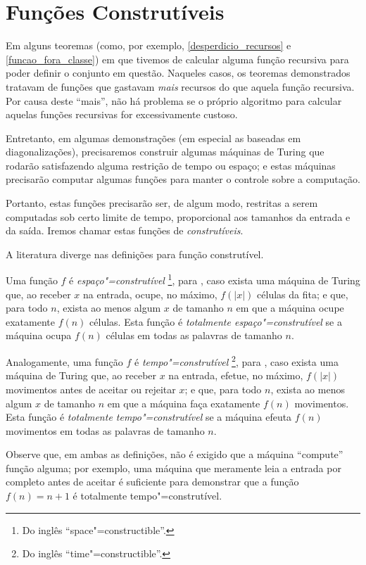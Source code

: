 \section{Funções Construtíveis}

Em alguns teoremas
(como, por exemplo, \ref{desperdicio_recursos} e \ref{funcao_fora_classe})
em que tivemos de calcular alguma função recursiva
para poder definir o conjunto em questão.
Naqueles casos,
os teoremas demonstrados tratavam de funções
que gastavam \emph{mais} recursos do que aquela função recursiva.
Por causa deste ``mais'',
não há problema
se o próprio algoritmo para calcular aquelas funções recursivas
for excessivamente custoso.

Entretanto,
em algumas demonstrações
(em especial as baseadas em diagonalizações),
precisaremos construir algumas máquinas de Turing
que rodarão satisfazendo alguma restrição de tempo ou espaço;
e estas máquinas precisarão computar algumas funções
para manter o controle sobre a computação.

Portanto,
estas funções precisarão ser,
de algum modo,
restritas a serem computadas sob certo limite de tempo,
proporcional aos tamanhos da entrada e da saída.
Iremos chamar estas funções de \emph{construtíveis}.

A literatura diverge nas definições para função construtível.

Uma função $f$ é \emph{espaço"=construtível}
\footnote{
    Do inglês ``space"=constructible''.
}, para
,
caso exista uma máquina de Turing que,
ao receber $x$ na entrada,
ocupe, no máximo, $f(|x|)$ células da fita;
e que, para todo $n$, exista ao menos algum $x$ de tamanho $n$
em que a máquina ocupe exatamente $f(n)$ células.
Esta função é \emph{totalmente espaço"=construtível}
se a máquina ocupa $f(n)$ células em todas as palavras de tamanho $n$.

Analogamente, uma função $f$ é \emph{tempo"=construtível}
\footnote{
    Do inglês ``time"=constructible''.
}, para
,
caso exista uma máquina de Turing que,
ao receber $x$ na entrada,
efetue, no máximo, $f(|x|)$ movimentos antes de aceitar ou rejeitar $x$;
e que, para todo $n$, exista ao menos algum $x$ de tamanho $n$
em que a máquina faça exatamente $f(n)$ movimentos.
Esta função é \emph{totalmente tempo"=construtível}
se a máquina efeuta $f(n)$ movimentos em todas as palavras de tamanho $n$.

Observe que,
em ambas as definições,
não é exigido que a máquina ``compute'' função alguma;
por exemplo,
uma máquina que meramente leia a entrada por completo antes de aceitar
é suficiente para demonstrar que a função $f(n) = n+1$
é totalmente tempo"=construtível.

